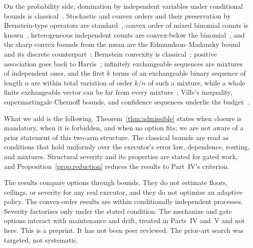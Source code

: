 \documentclass[11pt]{article}
\theoremstyle{definition}
\theoremstyle{remark}
\begin{document}
On the probability side, domination by independent variables under conditional bounds is
classical~\cite{doerr}. Stochastic and convex orders and their preservation by Bernstein-type operators
are standard~\cite{shaked,adell}, convex order of mixed binomial counts is known~\cite{lefevre17},
heterogeneous independent counts are convex-below the binomial~\cite{hoeffding56}, and the sharp convex
bounds from the mean are the Edmundson--Madansky bound and its discrete
counterpart~\cite{madansky59,denuit97};
Bernstein convexity is classical~\cite{lorentz}; positive association goes back to
Harris~\cite{harris,fkg}; infinitely exchangeable sequences are mixtures of independent ones, and the
first $k$ terms of an exchangeable binary sequence of length $n$ are within total variation of order
$k/n$ of such a mixture, while a whole finite exchangeable vector can be far from every
mixture~\cite{diaconis};
Ville's inequality, supermartingale Chernoff bounds, and confidence sequences underlie the
budget~\cite{ville,howard20,howard}.

What we add is the following. Theorem~\ref{thm:admissible} states when closure is mandatory, when it
is forbidden, and when no option fits; we are not aware of a prior statement of this two-arm
structure. The classical bounds are read as conditions that hold uniformly over the executor's error
law, dependence, routing, and mixtures. Structural severity and its properties are stated for gated
work, and Proposition~\ref{prop:reduction} reduces the results to Part~IV's criterion.

The results compare options through bounds. They do not estimate floors, ceilings, or severity for
any real executor, and they do not optimize an adaptive policy. The convex-order results are within
conditionally independent processes. Severity factorizes only under the stated condition. The
mechanize and gate options interact with maintenance and drift, treated in Parts~IV and~V and not
here. This is a preprint. It has not been peer reviewed. The prior-art search was targeted, not
systematic.
\end{document}
